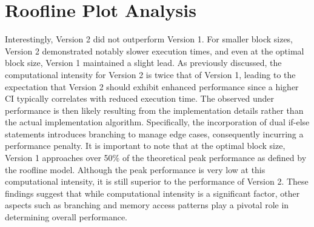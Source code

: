 \documentclass{article}
\begin{document}
\section{Roofline Plot Analysis}

Interestingly, Version 2 did not outperform Version 1. For smaller block sizes, Version 2 demonstrated notably slower execution times, and even at the optimal block size, Version 1 maintained a slight lead. As previously discussed, the computational intensity for Version 2 is twice that of Version 1, leading to the expectation that Version 2 should exhibit enhanced performance since a higher CI typically correlates with reduced execution time. The observed under performance is then likely resulting from the implementation details rather than the actual implementation algorithm. Specifically, the incorporation of dual if-else statements introduces branching to manage edge cases, consequently incurring a performance penalty. It is important to note that at the optimal block size, Version 1 approaches over 50\% of the theoretical peak performance as defined by the roofline model. Although the peak performance is very low at this computational intensity, it is still superior to the performance of Version 2. These findings suggest that while computational intensity is a significant factor, other aspects such as branching and memory access patterns play a pivotal role in determining overall performance. 
\end{document}
